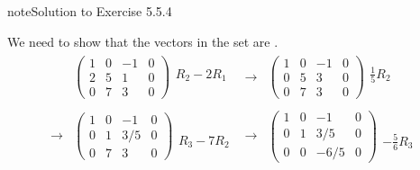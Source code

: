 \documentclass[letterpaper,10pt,english]{jupyterBook}
\begin{document}
\begin{sphinxadmonition}{note}{Solution to Exercise 5.5.4}



\sphinxAtStartPar
We need to show that the vectors in the set are {\hyperref[\detokenize{_pages/5.3_Linear_dependence:linear-dependence-definition}]{}}.
\begin{equation*}
\begin{split} \begin{align*}
    & \left( \begin{array}{ccc|c}
        1 & 0 & -1 & 0 \\
        2 & 5 & 1 & 0 \\
        0 & 7 & 3 & 0
    \end{array} \right)
    \begin{matrix} \\ R_2 - 2R_1 \\ \phantom{x} \end{matrix} &
    \longrightarrow &
    \left( \begin{array}{ccc|c}
        1 & 0 & -1 & 0 \\
        0 & 5 & 3 & 0 \\
        0 & 7 & 3 & 0
    \end{array} \right)
    \begin{matrix} \\ \frac{1}{5}R_2 \\ \phantom{x} \end{matrix} \\ \\
    \longrightarrow &
    \left( \begin{array}{ccc|c}
        1 & 0 & -1 & 0 \\
        0 & 1 & 3/5 & 0 \\
        0 & 7 & 3 & 0
    \end{array} \right)
    \begin{matrix} \\ \\ R_3 - 7R_2 \end{matrix} &
    \longrightarrow &
    \left( \begin{array}{ccc|c}
        1 & 0 & -1 & 0 \\
        0 & 1 & 3/5 & 0 \\
        0 & 0 & -6/5 & 0
    \end{array} \right)
    \begin{matrix} \\ \\ -\frac{5}{6}R_3 \end{matrix}  \\ \\

\end{align*}
\end{split}
\end{equation*}
\end{sphinxadmonition}
\end{document}
